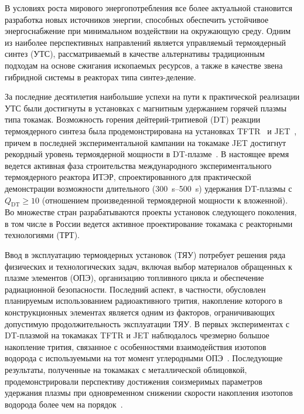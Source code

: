 {\actuality} В условиях роста мирового энергопотребления все более актуальной становится разработка новых источников энергии, способных обеспечить устойчивое энергоснабжение при минимальном воздействии на окружающую среду. Одним из наиболее перспективных направлений является управляемый термоядерный синтез (УТС), рассматриваемый в качестве альтернативы традиционным подходам на основе сжигания ископаемых ресурсов, а также в качестве звена гибридной системы в реакторах типа синтез-деление.

За последние десятилетия наибольшие успехи на пути к практической реализации УТС были достигнуты в установках с магнитным удержанием горячей плазмы типа токамак. Возможность горения дейтерий-тритиевой (DT) реакции термоядерного синтеза была продемонстрирована на установках TFTR~\cite{Skinner1997} и JET~\cite{Keilhacker1999}, причем в последней экспериментальной кампании на токамаке JET достигнут рекордный уровень термоядерной мощности в DT-плазме~\cite{Kappatou2025}. В настоящее время ведется активная фаза строительства международного экспериментального термоядерного реактора ИТЭР, спроектированного для практической демонстрации возможности длительного (\SIrange{300}{500}{\second}) удержания DT-плазмы с \( Q_\mathrm{DT} \geq 10 \) (отношением произведенной термоядерной мощности к вложенной). Во множестве стран разрабатываются проекты установок следующего поколения, в том числе в России ведется активное проектирование токамака с реакторными технологиями (ТРТ).

Ввод в эксплуатацию термоядерных установок (ТЯУ) потребует решения ряда физических и технологических задач, включая выбор материалов обращенных к плазме элементов (ОПЭ), организацию топливного цикла и обеспечение радиационной безопасности. Последний аспект, в частности, обусловлен планируемым использованием радиоактивного трития, накопление которого в конструкционных элементах является одним из факторов, ограничивающих допустимую продолжительность эксплуатации ТЯУ. В первых экспериментах с DT-плазмой на токамаках TFTR и JET наблюдалось чрезмерно большое накопление трития, связанное с особенностями взаимодействия изотопов водорода с используемыми на тот момент углеродными ОПЭ~\cite{Gasparyan2024}. Последующие результаты, полученные на токамаках с металлической облицовкой, продемонстрировали перспективу достижения соизмеримых параметров удержания плазмы при одновременном снижении скорости накопления изотопов водорода более чем на порядок~\cite{Brezinsek2015}.

